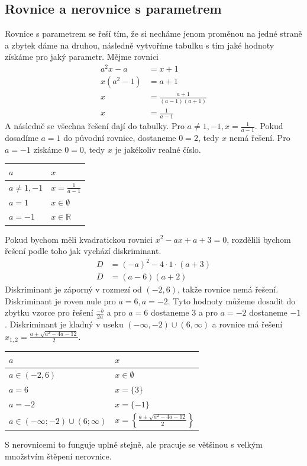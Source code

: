 \documentclass[12pt]{article}
\begin{document}
\subsection*{Rovnice a nerovnice s parametrem}
Rovnice s parametrem se řeší tím, že si necháme jenom proměnou na jedné straně a zbytek dáme
na druhou, následně vytvoříme tabulku s tím jaké hodnoty získáme pro jaký parametr. Mějme rovnici
\[
\begin{aligned}
    a^2x - a &= x + 1 \\
    x(a^2 - 1) &= a + 1 \\
    x &= \frac{a+1}{(a-1)(a+1)} \\
    x &= \frac{1}{a-1}
\end{aligned}
\]
A následně se všechna řešení dají do tabulky. Pro $a \ne 1, -1, x = \frac{1}{a-1}$. Pokud dosadíme
$a = 1$ do původní rovnice, dostaneme $0 = 2$, tedy $x$ nemá řešení. Pro $a = -1$ získáme $0 = 0$,
tedy $x$ je jakékoliv realné číslo.

\begin{center}
\begin{tabular}{|l|l|}
\hline
$a$ & $x$ \\
\hline
$a \ne 1, -1$ & $x = \frac{1}{a-1}$ \\
\hline
$a = 1$ & $x \in \emptyset$ \\
\hline
$a = -1$ & $x \in \mathbb{R}$ \\
\hline
\end{tabular}
\end{center}

Pokud bychom měli kvadratickou rovnici $x^2 -ax + a + 3 = 0$, rozdělili bychom řešení podle toho jak
vychází diskriminant.
\[
\begin{aligned}
    D &= (-a)^2 - 4 \cdot 1 \cdot (a+3) \\
    D &= (a-6)(a+2)
\end{aligned}
\]
Diskriminant je záporný v rozmezí od $(-2, 6)$, takže rovnice nemá řešení. Diskriminant je roven nule
pro $a = 6, a = -2$. Tyto hodnoty můžeme dosadit do zbytku vzorce pro řešení $\frac{-b}{2a}$ a pro
$a = 6$ dostaneme $3$ a pro $a = -2$ dostaneme $-1$. Diskriminant je kladný v useku $(-\infty, -2) 
\cup (6, \infty)$ a rovnice má řešení $x_{1,2} = \frac{a \pm \sqrt{a^2 - 4a -12}}{2}$.
\begin{center}
\renewcommand{\arraystretch}{1.5} 
\begin{tabular}{|l|l|}
    \hline
    $a$ & $x$ \\
    \hline
    $a \in (-2, 6)$ & $x \in \emptyset$ \\
    \hline
    $a = 6$ & $x = \{3\}$ \\
    \hline
    $a = -2$ & $x = \{-1\}$ \\
    \hline
    $a \in (-\infty; -2) \cup (6; \infty)$ & $x = \left\{ \frac{a \pm \sqrt{a^2 - 4a - 12}}{2} \right\}$ \\
    \hline
\end{tabular}
\end{center}
S nerovnicemi to funguje uplně stejně, ale pracuje se většinou s velkým množstvím štěpení nerovnice.
\end{document}
